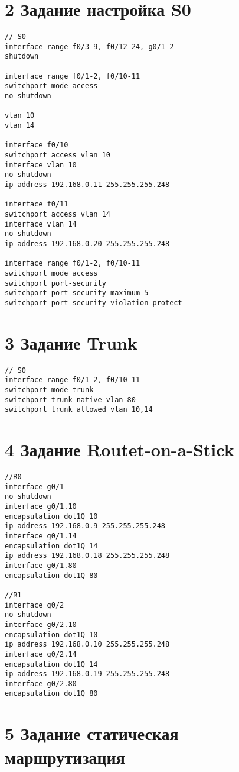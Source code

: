 \section{2 Задание настройка S0}

\begin{verbatim}
// S0
interface range f0/3-9, f0/12-24, g0/1-2
shutdown

interface range f0/1-2, f0/10-11
switchport mode access
no shutdown

vlan 10
vlan 14

interface f0/10
switchport access vlan 10
interface vlan 10
no shutdown
ip address 192.168.0.11 255.255.255.248

interface f0/11
switchport access vlan 14
interface vlan 14
no shutdown
ip address 192.168.0.20 255.255.255.248

interface range f0/1-2, f0/10-11
switchport mode access
switchport port-security
switchport port-security maximum 5
switchport port-security violation protect
\end{verbatim}

\section{3 Задание Trunk}

\begin{verbatim}
// S0
interface range f0/1-2, f0/10-11
switchport mode trunk
switchport trunk native vlan 80
switchport trunk allowed vlan 10,14
\end{verbatim}

\section{4 Задание Routet-on-a-Stick}

\begin{verbatim}
//R0
interface g0/1
no shutdown
interface g0/1.10
encapsulation dot1Q 10
ip address 192.168.0.9 255.255.255.248
interface g0/1.14
encapsulation dot1Q 14
ip address 192.168.0.18 255.255.255.248
interface g0/1.80
encapsulation dot1Q 80

//R1
interface g0/2
no shutdown
interface g0/2.10
encapsulation dot1Q 10
ip address 192.168.0.10 255.255.255.248
interface g0/2.14
encapsulation dot1Q 14
ip address 192.168.0.19 255.255.255.248
interface g0/2.80
encapsulation dot1Q 80
\end{verbatim}


\section{5 Задание статическая маршрутизация}

